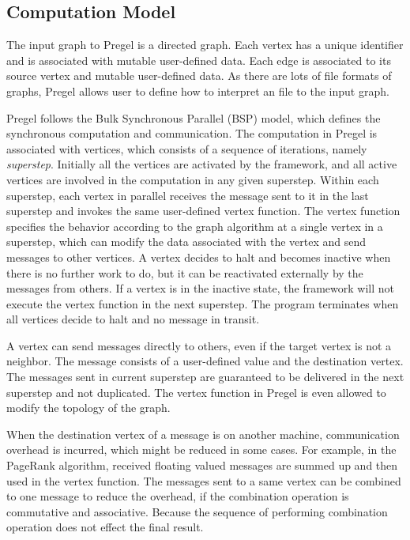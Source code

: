 \subsection{Computation Model}

The input graph to Pregel is a directed graph. Each vertex has a unique identifier and is associated with mutable user-defined data. Each edge is associated to its source vertex and mutable user-defined data. As there are lots of file formats of graphs, Pregel allows user to define how to interpret an file to the input graph.

Pregel follows the Bulk Synchronous Parallel (BSP) model\cite{valiant1990bridging}, which defines the synchronous computation and communication. The computation in Pregel is associated with vertices, which consists of a sequence of iterations, namely \textit{superstep}. Initially all the vertices are activated by the framework, and all active vertices are involved in the computation in any given superstep. Within each superstep, each vertex in parallel receives the message sent to it in the last superstep and invokes the same user-defined vertex function. The vertex function specifies the behavior according to the graph algorithm at a single vertex in a superstep, which can modify the data associated with the vertex and send messages to other vertices. A vertex decides to halt and becomes inactive when there is no further work to do, but it can be reactivated externally by the messages from others. If a vertex is in the inactive state, the framework will not execute the vertex function in the next superstep. The program terminates when all vertices decide to halt and no message in transit.

A vertex can send messages directly to others, even if the target vertex is not a neighbor. The message consists of a user-defined value and the destination vertex. The messages sent in current superstep are guaranteed to be delivered in the next superstep and not duplicated. The vertex function in Pregel is even allowed to modify the topology of the graph.

When the destination vertex of a message is on another machine, communication overhead is incurred, which might be reduced in some cases. For example, in the PageRank algorithm, received floating valued messages are summed up and then used in the vertex function. The messages sent to a same vertex can be combined to one message to reduce the overhead, if the combination operation is commutative and associative. Because the sequence of performing combination operation does not effect the final result.


